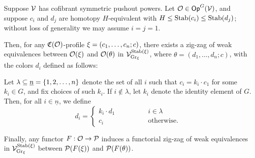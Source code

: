 \documentclass[a4paper,10pt
,draft
]{article}%
\renewcommand{\1}{\ensuremath{\mathbb{id}}}
\begin{document}
\begin{lemma}
      \label{CAV_4.14_PROP2}
      Suppose $\V$ has cofibrant symmetric pushout powers.
      Let $\O \in \Op^G(\V)$, and suppose
      $c_i$ and $d_j$ are homotopy $H$-equivalent with $H \leq \Stab(c_i) \leq \Stab(d_j)$;
      without loss of generality we may assume $i = j = 1$.

      Then, for any $\mathfrak C(\O)$-profile $\ksi = (c_1,\dots,c_n;c)$,
      there exists a zig-zag of weak equivalences between
      $\O(\ksi)$ and $\O(\theta)$
      in $\V^{\Stab(\xi)}_{\mathrm{Gr}_\xi}$,
      where
      $\theta = (d_1,\ldots, d_n; c)$, with the colors $d_i$ defined as follows:
            
      Let $\lambda \subseteq \underline{n} = \set{1,2,\ldots, n}$ denote
      the set of all $i$ such that $c_i = k_i \cdot c_1$ for some $k_i\in G$,
      and fix choices of such $k_i$.
      If $i \notin \lambda$, let $k_i$ denote the identity element of $G$.
      Then, for all $i \in \underline{n}$, we define
      \begin{equation}
            \label{DCOLORS_EQ}
            d_i =
            \begin{cases}
                  k_i \cdot d_1 \qquad \qquad & i \in \lambda
                  \\
                  c_i & \mbox{otherwise.}
            \end{cases}
      \end{equation}
      
      Finally, any functor $F: \O \to \P$ induces a functorial zig-zag of weak equivalences in $\V^{\Stab(\ksi)}_{\mathrm{Gr}_\ksi}$
      between $\P(F(\ksi))$ and $\P(F(\theta))$.
\end{lemma}
\end{document}
